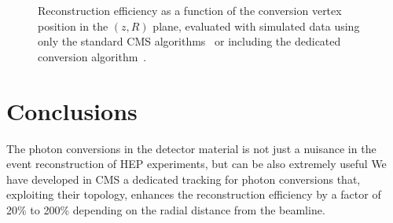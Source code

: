 \documentclass[a4paper]{jpconf}
\begin{document}
\begin{figure}[h]
\centering
{}
\caption{Reconstruction efficiency as a function of the conversion vertex position in the $(z,R)$ plane, evaluated with simulated data using only the standard CMS algorithms~  or including the dedicated conversion algorithm~. }
\label{fig:RZCoverage}
\end{figure}



\section{Conclusions}
\label{section_conclusions}

The photon conversions in the detector material is not just a nuisance in the event reconstruction of HEP experiments, but can be also extremely useful 
We have developed in CMS	a dedicated tracking for photon  conversions that,
exploiting their topology, enhances the reconstruction efficiency by a factor of 20\% to 200\% depending on the radial distance from the beamline.
\end{document}
